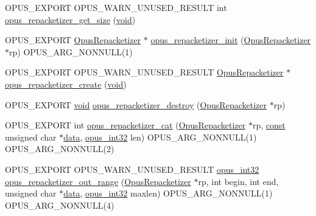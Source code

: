 \begin{DoxyCompactItemize}
\item 
O\+P\+U\+S\+\_\+\+E\+X\+P\+O\+RT O\+P\+U\+S\+\_\+\+W\+A\+R\+N\+\_\+\+U\+N\+U\+S\+E\+D\+\_\+\+R\+E\+S\+U\+LT int \hyperlink{group__opus__repacketizer_ga833b745bf92317e9ac26797a56eba6fd}{opus\+\_\+repacketizer\+\_\+get\+\_\+size} (\hyperlink{png_8h_ac9c84fa68bbad002983e35ce3663c686}{void})
\item 
O\+P\+U\+S\+\_\+\+E\+X\+P\+O\+RT \hyperlink{group__opus__repacketizer_ga1f85070a64bcbf5bf24f5ccb80323e7b}{Opus\+Repacketizer} $\ast$ \hyperlink{group__opus__repacketizer_gadef533688e80dcc96a32b955657aaf28}{opus\+\_\+repacketizer\+\_\+init} (\hyperlink{group__opus__repacketizer_ga1f85070a64bcbf5bf24f5ccb80323e7b}{Opus\+Repacketizer} $\ast$rp) O\+P\+U\+S\+\_\+\+A\+R\+G\+\_\+\+N\+O\+N\+N\+U\+LL(1)
\item 
O\+P\+U\+S\+\_\+\+E\+X\+P\+O\+RT O\+P\+U\+S\+\_\+\+W\+A\+R\+N\+\_\+\+U\+N\+U\+S\+E\+D\+\_\+\+R\+E\+S\+U\+LT \hyperlink{group__opus__repacketizer_ga1f85070a64bcbf5bf24f5ccb80323e7b}{Opus\+Repacketizer} $\ast$ \hyperlink{group__opus__repacketizer_gaa70e9708619188f673b5dc3f494c46ea}{opus\+\_\+repacketizer\+\_\+create} (\hyperlink{png_8h_ac9c84fa68bbad002983e35ce3663c686}{void})
\item 
O\+P\+U\+S\+\_\+\+E\+X\+P\+O\+RT \hyperlink{png_8h_ac9c84fa68bbad002983e35ce3663c686}{void} \hyperlink{group__opus__repacketizer_gab03f22d1139a42e450761ad99ca3d882}{opus\+\_\+repacketizer\+\_\+destroy} (\hyperlink{group__opus__repacketizer_ga1f85070a64bcbf5bf24f5ccb80323e7b}{Opus\+Repacketizer} $\ast$rp)
\item 
O\+P\+U\+S\+\_\+\+E\+X\+P\+O\+RT int \hyperlink{group__opus__repacketizer_gaa739f0bbc0ad09ad159ffb6455a6bb55}{opus\+\_\+repacketizer\+\_\+cat} (\hyperlink{group__opus__repacketizer_ga1f85070a64bcbf5bf24f5ccb80323e7b}{Opus\+Repacketizer} $\ast$rp, \hyperlink{zconf_8h_a2c212835823e3c54a8ab6d95c652660e}{const} unsigned char $\ast$\hyperlink{jpeglib_8h_aa379dc8ae39e55ae0c431a61a7d2f2bc}{data}, \hyperlink{opus__types_8h_aa4d309d6f80b99dbabebc8f98879ab9a}{opus\+\_\+int32} len) O\+P\+U\+S\+\_\+\+A\+R\+G\+\_\+\+N\+O\+N\+N\+U\+LL(1) O\+P\+U\+S\+\_\+\+A\+R\+G\+\_\+\+N\+O\+N\+N\+U\+LL(2)
\item 
O\+P\+U\+S\+\_\+\+E\+X\+P\+O\+RT O\+P\+U\+S\+\_\+\+W\+A\+R\+N\+\_\+\+U\+N\+U\+S\+E\+D\+\_\+\+R\+E\+S\+U\+LT \hyperlink{opus__types_8h_aa4d309d6f80b99dbabebc8f98879ab9a}{opus\+\_\+int32} \hyperlink{group__opus__repacketizer_gad06762a8f4032823f6b64b63e8416efc}{opus\+\_\+repacketizer\+\_\+out\+\_\+range} (\hyperlink{group__opus__repacketizer_ga1f85070a64bcbf5bf24f5ccb80323e7b}{Opus\+Repacketizer} $\ast$rp, int begin, int end, unsigned char $\ast$\hyperlink{jpeglib_8h_aa379dc8ae39e55ae0c431a61a7d2f2bc}{data}, \hyperlink{opus__types_8h_aa4d309d6f80b99dbabebc8f98879ab9a}{opus\+\_\+int32} maxlen) O\+P\+U\+S\+\_\+\+A\+R\+G\+\_\+\+N\+O\+N\+N\+U\+LL(1) O\+P\+U\+S\+\_\+\+A\+R\+G\+\_\+\+N\+O\+N\+N\+U\+LL(4)

\end{DoxyCompactItemize}
